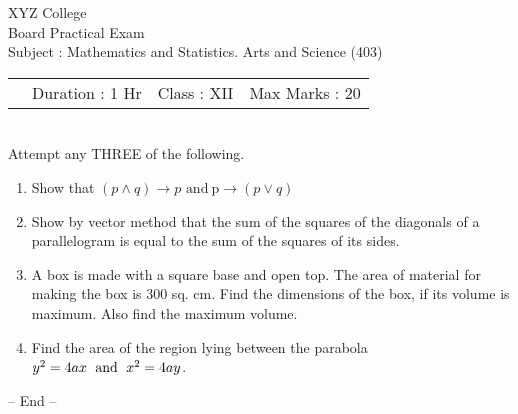 \documentclass[12pt,a4paper]{article}
\begin{document}
\begin{center}
XYZ College\\
Board Practical Exam\doublespacing \\
Subject : Mathematics and Statistics. Arts and Science (403)\\
\end{center}

\hspace{-0.5cm} 
\begin{tabu} to \textwidth { X[l] X[c] X[r]}
\ \  Duration : 1 Hr & Class : XII  & Max Marks : 20\\
\end{tabu} \\

 
 
 
 Attempt any THREE of the following.  
\begin{enumerate}
\item Show that 
$(p \wedge q)\to p$ $ \text{and} \ $p$ \to(p \vee q)$  
\item Show by vector method that the sum of the squares of the diagonals of a parallelogram is equal to the sum of the squares of its sides.
\item A box is made with a square base and open top. The area of material for making the box is 300 sq. cm. Find the dimensions of the box, if its volume is maximum. Also find the maximum volume.
\item Find the area of the region lying between the parabola\quad$y^2 = 4ax \text{\; and \;} x^2=4ay$\;.
\end{enumerate}
\begin{center} -- End --   \end{center}
\end{document}
